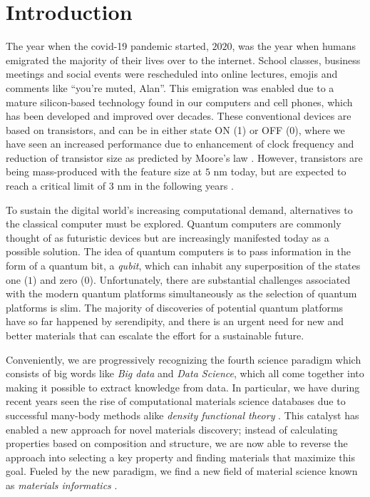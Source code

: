 \chapter{Introduction}

The year when the covid-19 pandemic started, $2020$, was the year when humans emigrated the majority of their lives over to the internet. School classes, business meetings and social events were rescheduled into online lectures, emojis and comments like ``you're muted, Alan''. This emigration was enabled due to a mature silicon-based technology found in our computers and cell phones, which has been developed and improved over decades. These conventional devices are based on transistors, and can be in either state ON (1) or OFF (0), where we have seen an increased performance due to enhancement of clock frequency and reduction of transistor size as predicted by Moore's law \cite{Moore1965, Pavicic2006}. However, transistors are being mass-produced with the feature size at $5$ nm today, but are expected to reach a critical limit of $3$ nm in the following years \cite{Gwennap2020}.



To sustain the digital world's increasing computational demand, alternatives to the classical computer must be explored. Quantum computers are commonly thought of as futuristic devices but are increasingly manifested today as a possible solution. The idea of quantum computers is to pass information in the form of a quantum bit, a \textit{qubit}, which can inhabit any superposition of the states one ($1$) and zero ($0$). Unfortunately, there are substantial challenges associated with the modern quantum platforms simultaneously as the selection of quantum platforms is slim. The majority of discoveries of potential quantum platforms have so far happened by serendipity, and there is an urgent need for new and better materials that can escalate the effort for a sustainable future.

Conveniently, we are progressively recognizing the fourth science paradigm which consists of big words like \textit{Big data} and \textit{Data Science}, which all come together into making it possible to extract knowledge from data. In particular, we have during recent years seen the rise of computational materials science databases \cite{Curtarolo2012, Curtarolo2012a, Calderon2015, Jain2013, Jain2016, Jain2018, Saal2013, Kirklin2015, Choudhary2020, Allen1987} due to successful many-body methods alike \textit{density functional theory} \cite{Kohn1965}. This catalyst has enabled a new approach for novel materials discovery; instead of calculating properties based on composition and structure, we are now able to reverse the approach into selecting a key property and finding materials that maximize this goal.
Fueled by the new paradigm, we find a new field of material science known as \textit{materials informatics} \cite{Rajan2005}.

